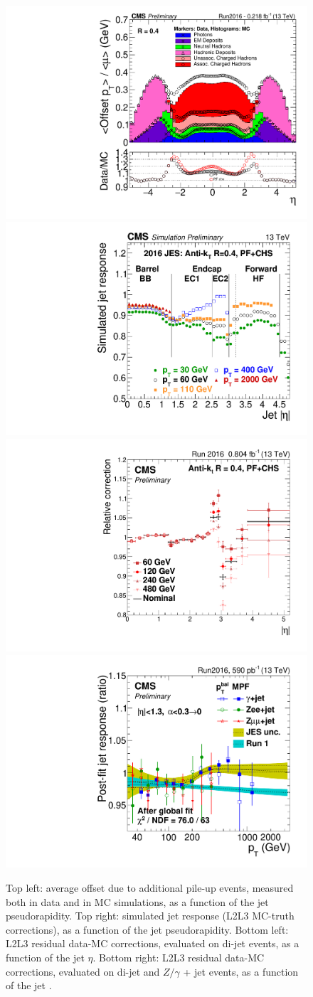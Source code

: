 \begin{figure}[!htb]
  \centering
    \includegraphics[width=.5\textwidth]{figures/JetPlots/stack2016.pdf}%
    \includegraphics[width=.5\textwidth]{figures/JetPlots/CMSresponse_ak4pfchs_L1FastL2L3.pdf}
\\
    \includegraphics[width=.5\textwidth]{figures/JetPlots/L2Res_logpt_MPF_kFSRfit_AK4PFchs_pythia8_2016.pdf}%
    \includegraphics[width=.5\textwidth]{figures/JetPlots/globalFitL3res_shifted_2016.pdf}

  \caption{Top left: average \pt offset due to additional pile-up events, measured both in data and in MC simulations, as a function of the jet pseudorapidity. Top right: simulated jet response (L2L3 MC-truth corrections), as a function of the jet pseudorapidity. Bottom left: L2L3 residual data-MC corrections, evaluated on di-jet events, as a function of the jet $\eta$. Bottom right: L2L3 residual data-MC corrections, evaluated on di-jet and $Z/\gamma$ + jet events, as a function of the jet \pt.~\cite{CMS-DP-2016-020}}
  \label{fig:plot_JEC}
\end{figure}

